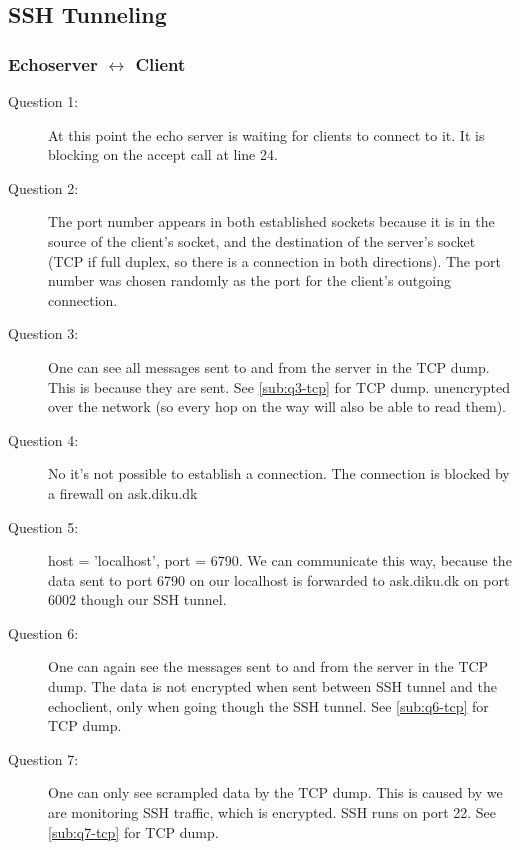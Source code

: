 \subsection{SSH Tunneling}
\subsubsection{{\sc Echoserver} $\leftrightarrow$ {\sc Client}}
\begin{description}
    \item[Question 1:] At this point the echo server is waiting for clients to connect to it. It is blocking on
        the accept call at line 24.
    \item[Question 2:] The port number appears in both established sockets because it is in the source of the client's
        socket, and the destination of the server's socket (TCP if full duplex, so there is a connection in both directions).
        The port number was chosen randomly as the port for the client's outgoing connection.
    \item[Question 3:] One can see all messages sent to and from the server in the TCP dump. This is because they are sent. See \autoref{sub:q3-tcp} for TCP dump.
        unencrypted over the network (so every hop on the way will also be able to read them).
    \item[Question 4:] No it's not possible to establish a connection. The connection is blocked by a firewall on ask.diku.dk %
    \item[Question 5:]  host = 'localhost', port = 6790. We can communicate this way, because the data sent to port 6790 on our localhost is forwarded to ask.diku.dk on port 6002 though our SSH tunnel.
    \item[Question 6:] One can again see the messages sent to and from the server in the TCP dump. The data is not encrypted when sent between SSH tunnel and the echoclient, only when going though the SSH tunnel. See \autoref{sub:q6-tcp} for TCP dump.

    \item[Question 7:] One can only see scrampled data by the TCP dump. This is caused by we are monitoring SSH traffic, which is encrypted. SSH runs on port 22. See \autoref{sub:q7-tcp} for TCP dump.


\end{description}
